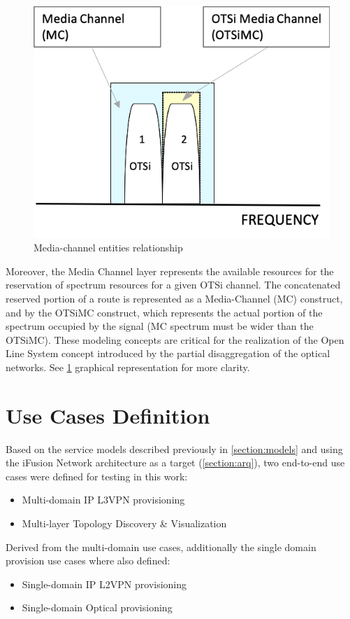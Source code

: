 \documentclass[a4paper,fleqn]{cas-dc}
\begin{document}
\begin{figure}
	\centering
		\includegraphics[scale=0.75]{figs/Media_channel.png}
	\caption{Media-channel entities relationship}
	\label{FIG:Media_channel}
\end{figure}

Moreover, the Media Channel layer represents the available resources for the reservation of spectrum resources for a given OTSi channel. The concatenated reserved portion of a route is represented as a Media-Channel (MC) construct, and by the OTSiMC construct, which represents the actual portion of the spectrum occupied by the signal (MC spectrum must be wider than the OTSiMC). These modeling concepts are critical for the realization of the Open Line System concept introduced by the partial disaggregation of the optical networks. See \cref{FIG:Media_channel} graphical representation for more clarity.


\section{Use Cases Definition}
\label{sec:usecasesdef}
Based on the service models described previously in \cref{section:models} and using the iFusion Network architecture as a target (\cref{section:arq}), two end-to-end use cases were defined for testing in this work: 
\begin{itemize}
    \item Multi-domain IP L3VPN provisioning
    \item Multi-layer Topology Discovery \& Visualization
\end{itemize}
Derived from the multi-domain use cases, additionally the single domain provision use cases where also defined:
\begin{itemize}
    \item Single-domain IP L2VPN provisioning
    \item Single-domain Optical provisioning
\end{itemize}
\end{document}
